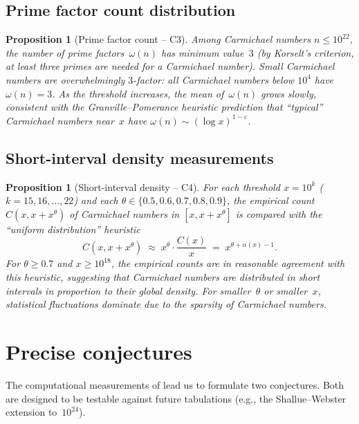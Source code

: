 \documentclass[12pt]{amsart}
\theoremstyle{plain}
\newtheorem{proposition}[theorem]{Proposition}
\theoremstyle{definition}
\theoremstyle{remark}
\begin{document}
\subsection{Prime factor count distribution}\label{subsec:C3}

\begin{proposition}[Prime factor count -- C3]\label{prop:C3}
Among Carmichael numbers $n\le 10^{22}$, the number of prime
factors~$\omega(n)$ has minimum value~$3$ (by Korselt's criterion,
at least three primes are needed for a Carmichael number).  Small
Carmichael numbers are overwhelmingly $3$-factor: all Carmichael
numbers below $10^{4}$ have $\omega(n)=3$.  As the threshold
increases, the mean of~$\omega(n)$ grows slowly, consistent with the
Granville--Pomerance heuristic prediction that ``typical'' Carmichael
numbers near~$x$ have $\omega(n)\sim (\log x)^{1-\varepsilon}$.
\end{proposition}

\subsection{Short-interval density measurements}\label{subsec:C4}

\begin{proposition}[Short-interval density -- C4]\label{prop:C4}
For each threshold $x=10^{k}$ ($k=15,16,\ldots,22$) and each
$\theta\in\{0.5,0.6,0.7,0.8,0.9\}$, the empirical count $C(x,x+x^{\theta})$
of Carmichael numbers in $[x,x+x^{\theta}]$ is compared with the
``uniform distribution'' heuristic
\[
  C(x,x+x^{\theta})\;\approx\; x^{\theta}\cdot\frac{C(x)}{x}
  \;=\; x^{\theta+\alpha(x)-1}.
\]
For $\theta\ge 0.7$ and $x\ge 10^{18}$, the empirical counts are in
reasonable agreement with this heuristic, suggesting that Carmichael
numbers are distributed in short intervals in proportion to their
global density.  For smaller~$\theta$ or smaller~$x$, statistical
fluctuations dominate due to the sparsity of Carmichael numbers.
\end{proposition}

\section{Precise conjectures}\label{sec:conjectures}

The computational measurements of  lead us to
formulate two conjectures.  Both are designed to be testable against
future tabulations (e.g., the Shallue--Webster extension
to~$10^{24}$).
\end{document}
